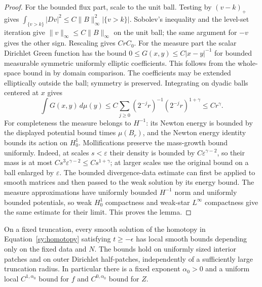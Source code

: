 \begin{proof}
For the bounded flux part, scale to the unit ball.  Testing by
$(v-k)_+$ gives
$\int_{\{v>k\}}|Dv|^2\le C\|B\|_\infty^2|\{v>k\}|$.
Sobolev's inequality and the level-set iteration give
$\|v\|_\infty\le C\|B\|_\infty$ on the unit ball; the same
argument for $-v$ gives the other sign.  Rescaling gives $CrC_0$.
For the measure part the scalar Dirichlet Green function has the
bound $0\le G(x,y)\le C|x-y|^{-1}$ for bounded measurable symmetric
uniformly elliptic coefficients.  This follows from the whole-space
bound in \cite[Theorem 7.1 and Equation (7.9)]{LittmanStampacchiaWeinberger1963}
by domain comparison.  The coefficients may be extended elliptically
outside the ball; symmetry is preserved.  Integrating on dyadic balls centered at $x$
gives
\[
 \int G(x,y)\,d\mu(y)
 \le C\sum_{j\ge0}(2^{-j}r)^{-1}
                      (2^{-j}r)^{1+\gamma}
 \le Cr^\gamma.
\]
For completeness the measure belongs to $H^{-1}$: its Newton energy
is bounded by the displayed potential bound times $\mu(B_r)$, and
the Newton energy identity bounds its action on $H^1_0$.  Mollifications
preserve the mass-growth bound uniformly.  Indeed, at scales
$s<\varepsilon$ their density is bounded by $C\varepsilon^{\gamma-2}$,
so their mass is at most
$Cs^3\varepsilon^{\gamma-2}\le Cs^{1+\gamma}$; at larger scales use
the original bound on a ball enlarged by $\varepsilon$.
The bounded divergence-data estimate can first be applied to smooth
matrices and then passed to the weak solution by its energy bound.
The measure approximations have uniformly bounded $H^{-1}$ norm and
uniformly bounded potentials, so weak $H^1_0$ compactness and weak-star
$L^\infty$ compactness give the same estimate for their limit.
This proves the lemma.
\end{proof}

\begin{proposition}\label{so:coupled-regularity}
On a fixed truncation, every smooth solution of the homotopy in
Equation~\ref{sy:homotopy} satisfying $t\ge-\epsilon$ has local smooth
bounds depending only on the fixed data and $N$.  The bounds hold on
uniformly sized interior patches and on outer Dirichlet half-patches,
independently of a sufficiently large truncation radius.  In particular
there is a fixed exponent $\alpha_0>0$ and a uniform local
$C^{1,\alpha_0}$ bound for $f$ and $C^{0,\alpha_0}$ bound for $Z$.
\end{proposition}

